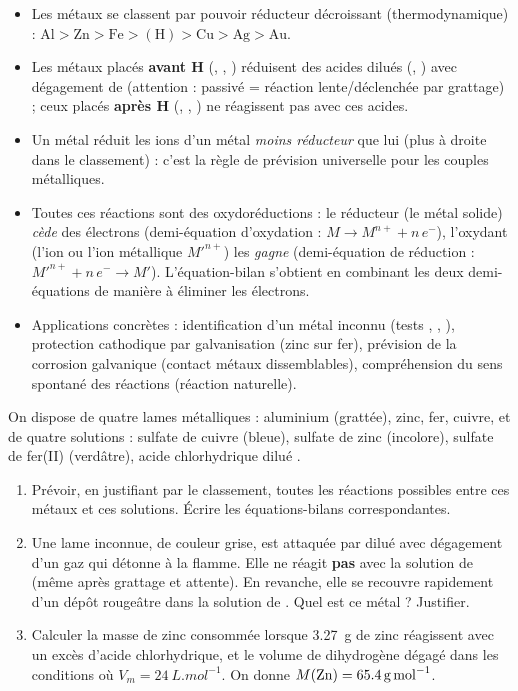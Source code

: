 \documentclass[11pt]{article}
\newcommand{\cle}[1]{{\popxbold\color{popdark}#1}}
\begin{document}
\begin{aretenir}
\begin{itemize}
\item Les métaux se classent par pouvoir réducteur décroissant (thermodynamique) : $\text{Al} > \text{Zn} > \text{Fe} > (\text{H}) > \text{Cu} > \text{Ag} > \text{Au}$.
\item Les métaux placés \textbf{avant H} (, , ) réduisent  des acides dilués (, ) avec dégagement de  (attention :  passivé = réaction lente/déclenchée par grattage) ; ceux placés \textbf{après H} (, , ) ne réagissent pas avec ces acides.
\item Un métal réduit les ions d'un métal \emph{moins réducteur} que lui (plus à droite dans le classement) : c'est la règle de prévision universelle pour les couples métalliques.
\item Toutes ces réactions sont des \cle{oxydoréductions} : le réducteur (le métal solide) \emph{cède} des électrons (demi-équation d'oxydation : $M \to M^{n+} + n\,e^-$), l'oxydant (l'ion  ou l'ion métallique $M'^{n+}$) les \emph{gagne} (demi-équation de réduction : $M'^{n+} + n\,e^- \to M'$). L'équation-bilan s'obtient en combinant les deux demi-équations de manière à éliminer les électrons.
\item Applications concrètes : identification d'un métal inconnu (tests , , ), protection cathodique par galvanisation (zinc sur fer), prévision de la corrosion galvanique (contact métaux dissemblables), compréhension du sens spontané des réactions (réaction naturelle).
\end{itemize}
\end{aretenir}

\begin{exercice}
On dispose de quatre lames métalliques : aluminium (grattée), zinc, fer, cuivre, et de quatre solutions : sulfate de cuivre  (bleue), sulfate de zinc  (incolore), sulfate de fer(II)  (verdâtre), acide chlorhydrique dilué .
\begin{enumerate}
\item Prévoir, en justifiant par le classement, toutes les réactions possibles entre ces métaux et ces solutions. Écrire les équations-bilans correspondantes.
\item Une lame inconnue, de couleur grise, est attaquée par  dilué avec dégagement d'un gaz qui détonne à la flamme. Elle ne réagit \textbf{pas} avec la solution de  (même après grattage et attente). En revanche, elle se recouvre rapidement d'un dépôt rougeâtre dans la solution de . Quel est ce métal ? Justifier.
\item Calculer la masse de zinc consommée lorsque \SI{3,27}{g} de zinc réagissent avec un excès d'acide chlorhydrique, et le volume de dihydrogène dégagé dans les conditions où $V_m = \SI{24}{L.mol^{-1}}$. On donne $M(\ce{Zn}) = \SI{65,4}{g.mol^{-1}}$.
\end{enumerate}
\end{exercice}
\end{document}
